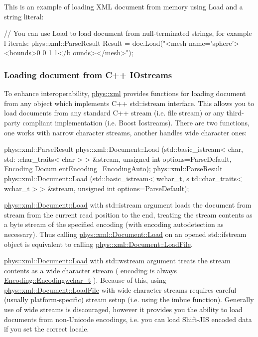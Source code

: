  This is an example of loading XML document from memory using Load and a string literal: 
\begin{DoxyCode}
 // You can use Load to load document from null-terminated strings, for example l
      iterals:
 phys::xml::ParseResult Result = doc.Load("<mesh name='sphere'><bounds>0 0 1 1</b
      ounds></mesh>");
\end{DoxyCode}
 \hypertarget{XMLManual_XMLLoadingStreams}{}\subsubsection{Loading document from C++ IOstreams}\label{XMLManual_XMLLoadingStreams}
To enhance interoperability, \hyperlink{namespacephys_1_1xml}{phys::xml} provides functions for loading document from any object which implements C++ std::istream interface. This allows you to load documents from any standard C++ stream (i.e. file stream) or any third-\/party compliant implementation (i.e. Boost Iostreams). There are two functions, one works with narrow character streams, another handles wide character ones: 
\begin{DoxyCode}
 phys::xml::ParseResult phys::xml::Document::Load (std::basic_istream< char, std:
      :char_traits< char > > &stream, unsigned int options=ParseDefault, Encoding Docum
      entEncoding=EncodingAuto);
 phys::xml::ParseResult phys::xml::Document::Load (std::basic_istream< wchar_t, s
      td::char_traits< wchar_t > > &stream, unsigned int options=ParseDefault);
\end{DoxyCode}
 \hyperlink{classphys_1_1xml_1_1Document_a9d4ddfd3b987fa3d31d41c06d06a001e}{phys::xml::Document::Load} with std::istream argument loads the document from stream from the current read position to the end, treating the stream contents as a byte stream of the specified encoding (with encoding autodetection as necessary). Thus calling \hyperlink{classphys_1_1xml_1_1Document_a9d4ddfd3b987fa3d31d41c06d06a001e}{phys::xml::Document::Load} on an opened std::ifstream object is equivalent to calling \hyperlink{classphys_1_1xml_1_1Document_a7f9dfcc3d30347773f92c8d46fe18f9a}{phys::xml::Document::LoadFile}. \par
 \par
 \hyperlink{classphys_1_1xml_1_1Document_a9d4ddfd3b987fa3d31d41c06d06a001e}{phys::xml::Document::Load} with std::wstream argument treats the stream contents as a wide character stream ( encoding is always \hyperlink{namespacephys_1_1xml_a420f5de782438f88160321385bea2015}{Encoding::Encodingwchar\_\-t} ). Because of this, using \hyperlink{classphys_1_1xml_1_1Document_a7f9dfcc3d30347773f92c8d46fe18f9a}{phys::xml::Document::LoadFile} with wide character streams requires careful (usually platform-\/specific) stream setup (i.e. using the imbue function). Generally use of wide streams is discouraged, however it provides you the ability to load documents from non-\/Unicode encodings, i.e. you can load Shift-\/JIS encoded data if you set the correct locale. \par
